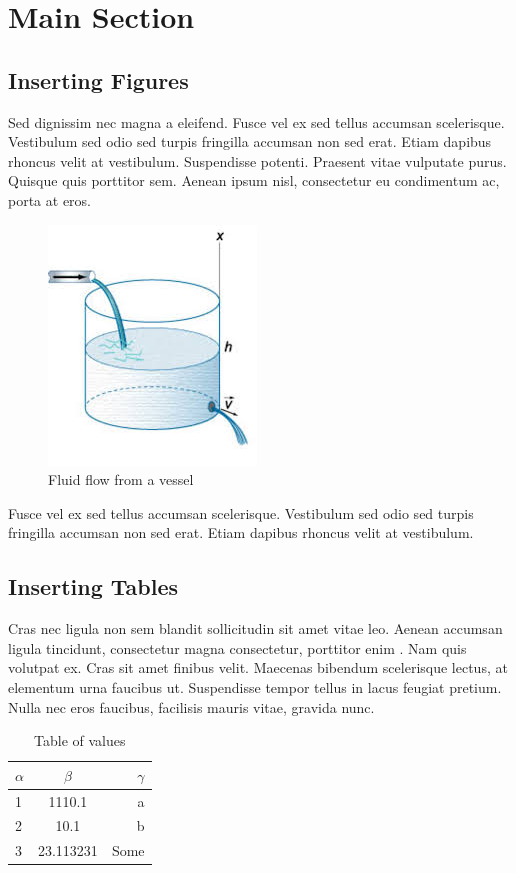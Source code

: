 \section{Main Section}
\lipsum[4] \cite{horn1985}
\subsection{Inserting Figures}
Sed dignissim nec magna a eleifend. Fusce vel ex sed tellus accumsan scelerisque. Vestibulum sed odio sed turpis fringilla accumsan non sed erat. Etiam dapibus rhoncus velit at vestibulum. Suspendisse potenti. Praesent vitae vulputate purus. Quisque quis porttitor sem. Aenean ipsum nisl, consectetur eu condimentum ac, porta at eros.\cite{jeff06}
\begin{figure}[htb!]
\centering
\includegraphics[scale=.75]{img/fluid-flow}
\caption{Fluid flow from a vessel}
\label{fig:fluid_flow}
\end{figure}
 Fusce vel ex sed tellus accumsan scelerisque. Vestibulum sed odio sed turpis fringilla accumsan non sed erat. Etiam dapibus rhoncus velit at vestibulum.

\subsection{Inserting Tables}
Cras nec ligula non sem blandit sollicitudin sit amet vitae leo. Aenean accumsan ligula tincidunt, consectetur magna consectetur, porttitor enim \cite{kir86}. Nam quis volutpat ex. Cras sit amet finibus velit. Maecenas bibendum scelerisque lectus, at elementum urna faucibus ut. Suspendisse tempor tellus in lacus feugiat pretium. Nulla nec eros faucibus, facilisis mauris vitae, gravida nunc.
\begin{table}[h!]
\centering
		\begin{tabular}{l|c|r} 
			\hline 
			$\alpha$ & $\beta$ & $\gamma$ \\
			\hline
			1 & 1110.1 & a\\
			2 & 10.1 & b\\
			3 & 23.113231 & Some\\ \hline 
		\end{tabular}
\caption{Table of values}
\label{tab:values}
\end{table}


